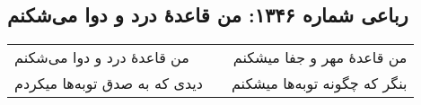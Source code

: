 \begin{center}
\section*{رباعی شماره ۱۳۴۶: من قاعدهٔ درد و دوا می‌شکنم}
\label{sec:1346}
\begin{longtable}{l p{0.5cm} r}
من قاعدهٔ درد و دوا می‌شکنم
&&
من قاعدهٔ مهر و جفا میشکنم
\\
دیدی که به صدق توبه‌ها میکردم
&&
بنگر که چگونه توبه‌ها میشکنم
\\
\end{longtable}
\end{center}

